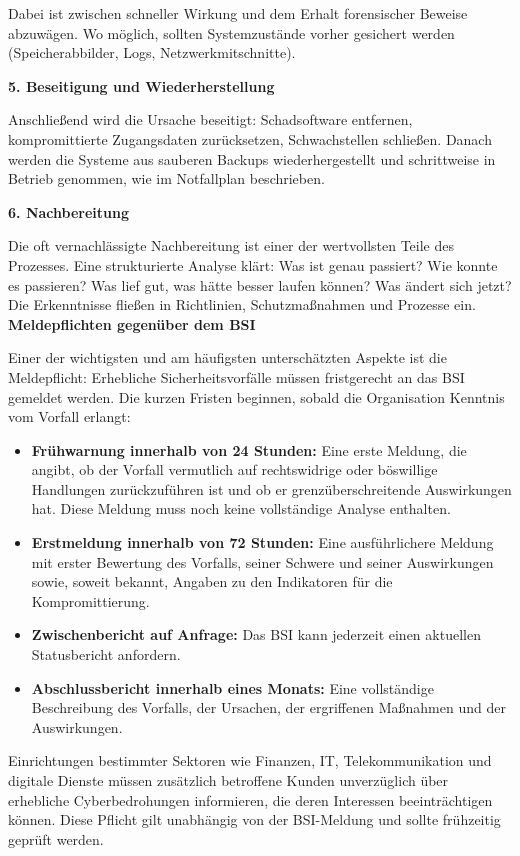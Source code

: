 Dabei ist zwischen schneller Wirkung und dem Erhalt forensischer Beweise abzuwägen. Wo möglich, sollten Systemzustände vorher gesichert werden (Speicherabbilder, Logs, Netzwerkmitschnitte).

\textbf{5. Beseitigung und Wiederherstellung}

Anschließend wird die Ursache beseitigt: Schadsoftware entfernen, kompromittierte Zugangsdaten zurücksetzen, Schwachstellen schließen. Danach werden die Systeme aus sauberen Backups wiederhergestellt und schrittweise in Betrieb genommen, wie im Notfallplan beschrieben.

\textbf{6. Nachbereitung}

Die oft vernachlässigte Nachbereitung ist einer der wertvollsten Teile des Prozesses. Eine strukturierte Analyse klärt: Was ist genau passiert? Wie konnte es passieren? Was lief gut, was hätte besser laufen können? Was ändert sich jetzt? Die Erkenntnisse fließen in Richtlinien, Schutzmaßnahmen und Prozesse ein.
\newpage
\textbf{Meldepflichten gegenüber dem BSI}

Einer der wichtigsten und am häufigsten unterschätzten Aspekte ist die Meldepflicht: Erhebliche Sicherheitsvorfälle müssen fristgerecht an das BSI gemeldet werden. Die kurzen Fristen beginnen, sobald die Organisation Kenntnis vom Vorfall erlangt:

\begin{itemize}
    \item \textbf{Frühwarnung innerhalb von 24 Stunden:} Eine erste Meldung, die angibt, ob der Vorfall vermutlich auf rechtswidrige oder böswillige Handlungen zurückzuführen ist und ob er grenzüberschreitende Auswirkungen hat. Diese Meldung muss noch keine vollständige Analyse enthalten.
    \item \textbf{Erstmeldung innerhalb von 72 Stunden:} Eine ausführlichere Meldung mit erster Bewertung des Vorfalls, seiner Schwere und seiner Auswirkungen sowie, soweit bekannt, Angaben zu den Indikatoren für die Kompromittierung.
    \item \textbf{Zwischenbericht auf Anfrage:} Das BSI kann jederzeit einen aktuellen Statusbericht anfordern.
    \item \textbf{Abschlussbericht innerhalb eines Monats:} Eine vollständige Beschreibung des Vorfalls, der Ursachen, der ergriffenen Maßnahmen und der Auswirkungen.
\end{itemize}

Einrichtungen bestimmter Sektoren wie Finanzen, IT, Telekommunikation und digitale Dienste müssen zusätzlich betroffene Kunden unverzüglich über erhebliche Cyberbedrohungen informieren, die deren Interessen beeinträchtigen können. Diese Pflicht gilt unabhängig von der BSI-Meldung und sollte frühzeitig geprüft werden.

